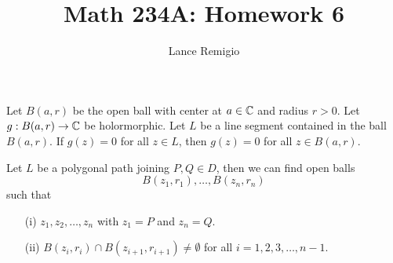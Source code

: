 \documentclass[a4paper]{article}
\title{Math 234A: Homework 6}
\author{Lance Remigio}
\begin{document}
\maketitle

\begin{lemma}
    Let \( B(a, r)  \) be the open ball with center at \( a \in \mathbb{C}  \) and radius \( r >0 \). Let \( g: B(a,r) \to \mathbb{C}  \) be holormorphic. Let \( L  \) be a line segment contained in the ball \( B(a,r) \). If \( g(z) = 0  \) for all \( z \in L  \), then \( g(z) = 0  \) for all \( z \in B(a,r) \).
\end{lemma}

\begin{lemma}
    Let \( L  \) be a polygonal path joining \( P,Q \in D  \), then we can find open balls \[ B({z}_{1}, {r}_{1}), \dots , B({z}_{n}, {r}_{n}) \] such that 
    \begin{enumerate}
        \item[(i)] \( {z}_{1}, {z}_{2}, \dots , {z}_{n} \) with \( {z}_{1} = P  \) and \( {z}_{n} = Q  \).
        \item[(ii)] \( B({z}_{i}, {r}_{i}) \cap B({z}_{i+1}, {r}_{i+1}) \neq \emptyset \) for all \( i = 1,2,3, \dots, n - 1 \).
    \end{enumerate}
\end{lemma}
\end{document}
